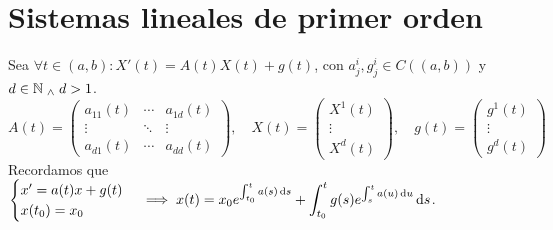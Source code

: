 \section{Sistemas lineales de primer orden}

Sea $\forall t \in (a, b) : X'(t) = A(t)X(t) + g(t)$, con $a_j^i, g_j^i \in C((a,b))$ y $d\in \mathbb{N} \; _{\wedge} \; d > 1$.
\[A(t) = \begin{pmatrix}
		a_{11}(t) & \cdots & a_{1d}(t) \\
		\vdots    & \ddots & \vdots    \\
		a_{d1}(t) & \cdots & a_{dd}(t)
	\end{pmatrix}, \quad X(t) = \begin{pmatrix}
		X^1(t) \\
		\vdots \\
		X^d(t)
	\end{pmatrix}, \quad g(t) = \begin{pmatrix}
		g^1(t) \\
		\vdots \\
		g^d(t)
	\end{pmatrix}\]
Recordamos que $\ds \begin{cases}
		x' = a(t)x + g(t) \\
		x(t_0) = x_0
	\end{cases} \implies x(t) = x_0 e^{\int_{t_0}^{t} a(s) \odif{s}} + \int_{t_0}^{t} g(s) e^{\int_{s}^{t} a(u) \odif{u}} \odif{s}$.

